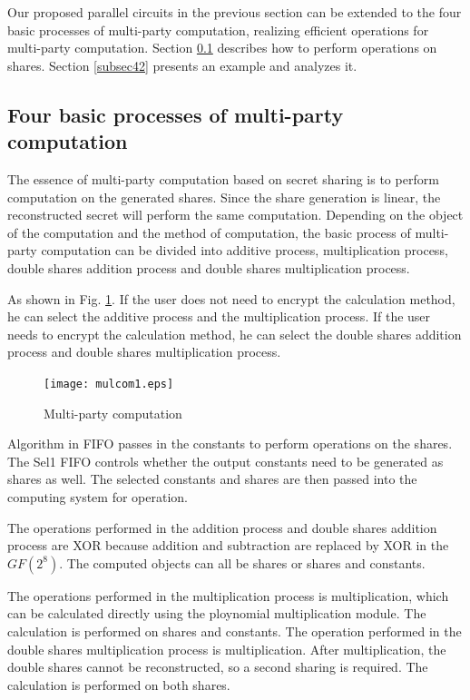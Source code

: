 Our proposed parallel circuits in the previous section can be extended to the four basic processes of multi-party computation, realizing efficient operations for multi-party computation. Section \ref{subsec41} describes how to perform operations on shares. Section \ref{subsec42} presents an example and analyzes it.

\subsection{Four basic processes of multi-party computation}\label{subsec41}
The essence of multi-party computation based on secret sharing is to perform computation on the generated shares. Since the share generation is linear, the reconstructed secret will perform the same computation. Depending on the object of the computation and the method of computation, the basic process of multi-party computation can be divided into additive process, multiplication process, double shares addition process and double shares multiplication process.


As shown in Fig. \ref{fig12}. If the user does not need to encrypt the calculation method, he can select the additive process and the multiplication process. If the user needs to encrypt the calculation method, he can select the double shares addition process and double shares multiplication process.

\begin{figure}[!htb]
	\begin{center}
		\texttt{[image: mulcom1.eps]}\\
		\caption{Multi-party computation}
		\label{fig12}
		\vspace{-2.0em}
	\end{center}
\end{figure}

Algorithm in FIFO passes in the constants to perform operations on the shares. The Sel1 FIFO controls whether the output constants need to be generated as shares as well. The selected constants and shares are then passed into the computing system for operation.

The operations performed in the addition process and double shares addition process are XOR because addition and subtraction are replaced by XOR in the $GF (2^{8})$. The computed objects can all be shares or shares and constants.

The operations performed in the multiplication process is multiplication, {\color{red}which can be calculated directly using the ploynomial multiplication module.} The calculation is performed on shares and constants. The operation performed in the double shares multiplication process is multiplication. After multiplication, the double shares cannot be reconstructed, so a second sharing is required. The calculation is performed on both shares.

